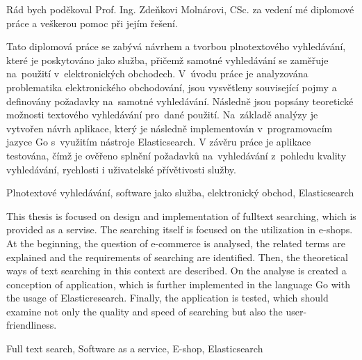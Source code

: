 \documentclass[FM,DP]{tulthesis}
\begin{document}


\begin{acknowledgement}
Rád bych poděkoval Prof. Ing. Zdeňkovi Molnárovi, CSc. za vedení mé diplomové práce
a veškerou pomoc při jejím řešení.
\end{acknowledgement}


\begin{abstractCZ}
Tato diplomová práce se zabývá návrhem a tvorbou plnotextového vyhledávání, které je poskytováno jako služba, 
přičemž samotné vyhledávání se zaměřuje na~použití v~elektronických obchodech. V~úvodu práce je analyzována 
problematika elektronického obchodování, jsou vysvětleny související pojmy a definovány požadavky na~samotné 
vyhledávání. Následně jsou popsány teoretické možnosti textového vyhledávání pro~dané použití. Na~základě
analýzy je vytvořen návrh aplikace, který je následně implementován v~programovacím jazyce Go s~využitím 
nástroje Elasticsearch. V závěru práce je aplikace testována, čímž je ověřeno splnění požadavků na~vyhledávání
z~pohledu kvality vyhledávání, rychlosti i uživatelské přívětivosti služby.
\end{abstractCZ}
\vspace{1cm}
\begin{klicovaslovaCZ}
Plnotextové vyhledávání, software jako služba, elektronický obchod, Elasticsearch
\end{klicovaslovaCZ}

\vspace{2cm}

\begin{abstractEN}
This thesis is focused on design and implementation of fulltext searching, which is provided as a servise. 
The searching itself is focused on the utilization in e-shops. At the beginning, the question of e-commerce 
is analysed, the related terms are explained and the requirements of searching are identified. Then, the 
theoretical ways of text searching in this context are described. On the analyse is created a conception 
of application, which is further implemented in the language Go with the usage of Elasticresearch. 
Finally, the application is tested, which should examine not only the quality and speed of searching 
but also the user-friendliness.
\end{abstractEN}
\vspace{1cm}
\begin{klicovaslovaEN}
Full text search, Software as a service, E-shop, Elasticsearch
\end{klicovaslovaEN}
\end{document}
